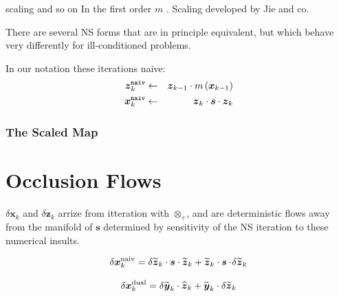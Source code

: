 \documentclass[letterpaper,twocolumn,amsmath,amsfont,amssymb,english,aps,jcp,preprintnumbers,groupaddress,nofootinbib,tightenlines]{revtex4}
\newcommand{\mat}[1]{\boldsymbol{#1}}
\newcommand{\ot}{ {\scriptstyle \otimes}_{ \tau } }
\begin{document}





scaling and so on
In the first order $m$ .  Scaling developed by Jie and co.

There are several NS forms that are in principle equivalent, but which behave very 
differently for ill-conditioned problems. 

In our notation these iterations naive: 
\begin{eqnarray}
\mat{z}^{\tt naiv}_{k}  &\leftarrow& \mat{z}_{k-1}  \cdot m \left( \mat{x}_{k-1} \right) \\
\mat{x}^{\tt naiv}_{k} &\leftarrow& \mat{z}_{k} \cdot \mat{s} \cdot \mat{z}_{k}
\end{eqnarray}





\subsubsection{The Scaled Map}







\section{Occlusion Flows}

$\delta \mat{x}_k$ and $\delta \mat{z}_k$ arrize from itteration with $\ot$, and are deterministic 
flows away from the manifold of $\mat{s}$ determined by sensitivity of the NS iteration to these 
numerical insults. 


\begin{equation}
\delta \mat{x}^{\rm{naiv}}_k =   \delta  \widetilde{ \mat{z}}_{k} \cdot \mat{s} \cdot \widetilde{\mat{z}}_{k} 
                           +  \widetilde{\mat{z}}_{k} \cdot \mat{s} \cdot \! \delta \widetilde{\mat{z}}_{k} 
\end{equation}



\begin{equation}
\delta \mat{x}^{\rm{dual}}_k =   \delta  \widetilde{ \mat{y}}_{k} \cdot \widehat{\mat{z}}_{k} 
                           +  \widetilde{\mat{y}}_{k} \cdot \delta \widetilde{\mat{z}}_{k} 
\end{equation}
\end{document}

